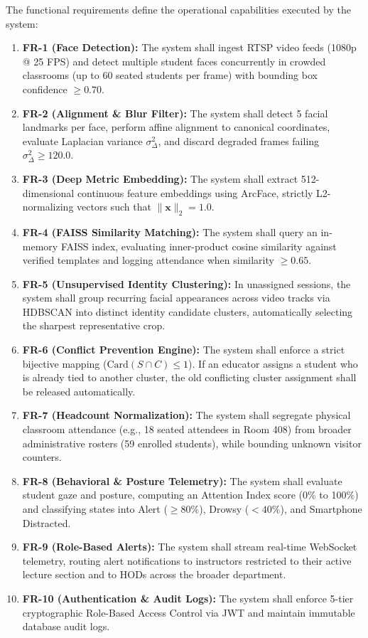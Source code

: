 \noindent The functional requirements define the operational capabilities executed by the system:
\begin{enumerate}
    \item \textbf{FR-1 (Face Detection):} The system shall ingest RTSP video feeds (1080p @ 25 FPS) and detect multiple student faces concurrently in crowded classrooms (up to 60 seated students per frame) with bounding box confidence $\ge 0.70$.
    \item \textbf{FR-2 (Alignment \& Blur Filter):} The system shall detect 5 facial landmarks per face, perform affine alignment to canonical coordinates, evaluate Laplacian variance $\sigma^2_\Delta$, and discard degraded frames failing $\sigma^2_\Delta \ge 120.0$.
    \item \textbf{FR-3 (Deep Metric Embedding):} The system shall extract 512-dimensional continuous feature embeddings using ArcFace, strictly L2-normalizing vectors such that $\|\mathbf{x}\|_2 = 1.0$.
    \item \textbf{FR-4 (FAISS Similarity Matching):} The system shall query an in-memory FAISS index, evaluating inner-product cosine similarity against verified templates and logging attendance when similarity $\ge 0.65$.
    \item \textbf{FR-5 (Unsupervised Identity Clustering):} In unassigned sessions, the system shall group recurring facial appearances across video tracks via HDBSCAN into distinct identity candidate clusters, automatically selecting the sharpest representative crop.
    \item \textbf{FR-6 (Conflict Prevention Engine):} The system shall enforce a strict bijective mapping ($\text{Card}(S \cap C) \le 1$). If an educator assigns a student who is already tied to another cluster, the old conflicting cluster assignment shall be released automatically.
    \item \textbf{FR-7 (Headcount Normalization):} The system shall segregate physical classroom attendance (e.g., 18 seated attendees in Room 408) from broader administrative rosters (59 enrolled students), while bounding unknown visitor counters.
    \item \textbf{FR-8 (Behavioral \& Posture Telemetry):} The system shall evaluate student gaze and posture, computing an Attention Index score (0\% to 100\%) and classifying states into Alert ($\ge 80\%$), Drowsy ($< 40\%$), and Smartphone Distracted.
    \item \textbf{FR-9 (Role-Based Alerts):} The system shall stream real-time WebSocket telemetry, routing alert notifications to instructors restricted to their active lecture section and to HODs across the broader department.
    \item \textbf{FR-10 (Authentication \& Audit Logs):} The system shall enforce 5-tier cryptographic Role-Based Access Control via JWT and maintain immutable database audit logs.
\end{enumerate}

